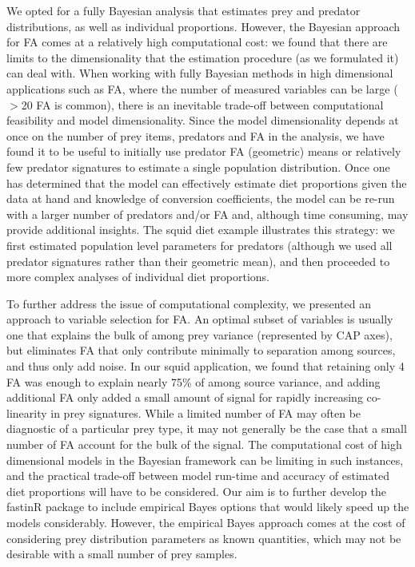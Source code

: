 \documentclass{article}%
\begin{document}
\begin{spacing}{1.9}
\begin{flushleft}
We opted for a fully Bayesian analysis that estimates prey and predator
distributions, as well as individual proportions. However, the Bayesian
approach for FA comes at a relatively
high computational cost: we found that there are limits to the dimensionality
that the estimation procedure (as we formulated it) can deal with. When working with
fully Bayesian methods in high dimensional applications such as FA,
where the number of measured variables can be large ($>$20 FA is common), there
is an inevitable trade-off between computational feasibility and
model dimensionality. Since the model dimensionality depends at once on the number of prey items, predators and
FA in the analysis, we have found it to be useful to
initially use
predator FA (geometric) means or relatively few predator signatures to
estimate a single population distribution. Once one has determined
that the model can effectively estimate diet proportions given the
data at hand and knowledge of conversion coefficients, the model can
be re-run with a larger number of predators and/or FA and, although time consuming, may provide additional
insights. The squid diet example illustrates this strategy: we first
estimated population level parameters for predators (although we used
all predator signatures rather than their geometric mean), and then
proceeded to more complex analyses of individual diet proportions.

To further address the issue of computational complexity, we presented
an approach to variable selection for FA. An optimal subset of
variables is usually one that explains the bulk of among prey variance
(represented by CAP axes), but eliminates FA that only contribute
minimally to separation among sources, and thus only add noise. In our
squid application, we found that retaining only 4 FA was enough to
explain nearly 75\% of among source variance, and adding additional FA
only added a small amount of signal for rapidly increasing
co-linearity in prey signatures. While a limited number of FA may
often be diagnostic of a particular prey type, it may not generally be
the case that a small number of FA account for the bulk of the
signal. The computational cost of high dimensional models in the
Bayesian framework can be limiting in such instances, and the
practical trade-off between model run-time and accuracy of estimated
diet proportions will have to be considered. Our aim is to further
develop the fastinR package to include empirical Bayes options \citep[as
described in][]{parnell_bayesian_2012} that would likely speed up
the models considerably. However, the empirical Bayes approach comes at the cost of considering prey
distribution parameters as known quantities, which may not be desirable with a
small number of prey samples.


\end{flushleft}
\end{spacing}
\end{document}
